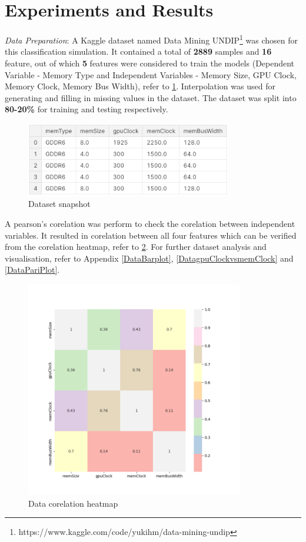 \documentclass[conference]{IEEEtran}
\begin{document}
\section{Experiments and Results}
	\noindent \textit{Data Preparation}: A Kaggle dataset named Data Mining UNDIP\footnote{https://www.kaggle.com/code/yukihm/data-mining-undip} was chosen for this classification simulation. It contained a total of  \textbf{2889} samples and \textbf{16} feature, out of which \textbf{5} features were considered to train the models (Dependent Variable - Memory Type and Independent Variables - Memory Size, GPU Clock, Memory Clock, Memory Bus Width), refer to \figurename{\ref{dataset}}. Interpolation was used for generating and filling in missing values in the dataset. The dataset was split into \textbf{80-20\%} for training and testing respectively.
	\begin{figure}[H]{}
	\centerline{\includegraphics[width=90mm,scale=1]{dataset.png}}
	\caption{Dataset snapshot}
	\label{dataset}
	\end{figure}
	A pearson's corelation was perform to check the corelation between independent variables. It resulted in corelation between all four features which can be verified from the corelation heatmap, refer to \figurename{\ref{DataCorelation}}. For further dataset analysis and visualisation, refer to Appendix \figurename{\ref{DataBarplot}}, \figurename{\ref{DatagpuClockvsmemClock}} and \figurename{\ref{DataPariPlot}}.\\
		\begin{figure}[H]
		\centerline{\includegraphics[width=95mm,scale=1]{DataCorelation.png}}
		\caption{Data corelation heatmap}
		\label{DataCorelation}
	\end{figure}
\end{document}
